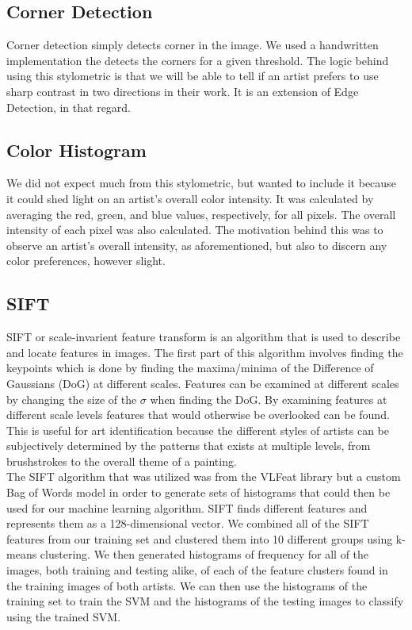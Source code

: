 \documentclass[twocolumn]{article}
\begin{document}
  \subsection{Corner Detection}
  Corner detection simply detects corner in the image. We used a handwritten
  implementation the detects the corners for a given threshold. The logic behind
  using this stylometric is that we will be able to tell if an artist prefers to
  use sharp contrast in two directions in their work. It is an extension of Edge
  Detection, in that regard. \\

  \subsection{Color Histogram}
  We did not expect much from this stylometric, but wanted to include it because
  it could shed light on an artist's overall color intensity. It was calculated
  by averaging the red, green, and blue values, respectively, for all pixels.
  The overall intensity of each pixel was also calculated. The motivation behind
  this was to observe an artist's overall intensity, as aforementioned, but also
  to discern any color preferences, however slight. \\

  \subsection{SIFT}
  SIFT or scale-invarient feature transform is an algorithm that is used to
  describe and locate features in images. The first part of this algorithm
  involves finding the keypoints which is done by finding the maxima/minima of
  the Difference of Gaussians (DoG) at different scales. Features can be examined
  at different scales by changing the size of the $\sigma$ when finding the DoG.
  By examining features at different scale levels features that would otherwise
  be overlooked can be found. This is useful for art identification because
  the different styles of artists can be subjectively determined by the patterns
  that exists at multiple levels, from brushstrokes to the overall theme of a
  painting. \\
  
  The SIFT algorithm that was utilized was from the VLFeat library but a custom
  Bag of Words model in order to generate sets of histograms that could then be
  used for our machine learning algorithm. SIFT finds different features and
  represents them as a 128-dimensional vector. We combined all of the SIFT features
  from our training set and clustered them into 10 different groups using k-means
  clustering. We then generated histograms of frequency for all of the images, both
  training and testing alike, of each of the feature clusters found in the training
  images of both artists. We can then use the histograms of the training set to
  train the SVM and the histograms of the testing images to classify using the
  trained SVM.
\end{document}
